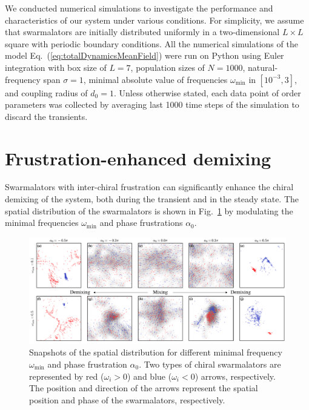 \documentclass{article}
\begin{document}
We conducted numerical simulations to investigate the performance and characteristics of our system under various conditions.
For simplicity, we assume that swarmalators are initially distributed uniformly in a two-dimensional $L\times L$ square with periodic boundary conditions.
All the numerical simulations of the model Eq.~(\ref{eq:totalDynamicsMeanField}) were run on Python using Euler integration with box size of $L=7$, population sizes of $N=1000$, natural-frequency span $\sigma=1$, minimal absolute value of frequencies $\omega_{\min}$ in $\left[ 10^{-3}, 3 \right]$, and coupling radius of $d_0=1$. 
Unless otherwise stated, each data point of order parameters was collected by averaging last 1000 time steps of the simulation to discard the transients.

\section{\label{sec:behaviors}Frustration-enhanced demixing}

Swarmalators with inter-chiral frustration can significantly enhance the chiral demixing of the system, both during the transient and in the steady state. 
The spatial distribution of the swarmalators is shown in Fig.~\ref{fig:snapshots} by modulating the minimal frequencies $\omega_{\min}$ and phase frustrations $\alpha_0$.

\begin{figure}
    \includegraphics[width=\textwidth]{./figs/snapshots.pdf}
    \caption{
        \label{fig:snapshots} Snapshots of the spatial distribution for different minimal frequency $\omega_{\min}$ and phase frustration $\alpha_0$. 
        Two types of chiral swarmalators are represented by red ($\omega_i>0$) and blue ($\omega_i<0$) arrows, respectively.
        The position and direction of the arrows represent the spatial position and phase of the swarmalators, respectively.
    }
\end{figure}
\end{document}
